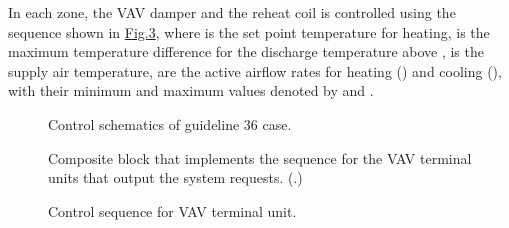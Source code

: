 \documentclass[letterpaper,10pt, openany,english]{sphinxmanual}
\begin{document}
In each zone, the VAV damper and the reheat coil is controlled using the
sequence shown in \hyperref[\detokenize{example:fig-dam-val-reh}]{Fig.\@ \ref{\detokenize{example:fig-dam-val-reh}}}, where
 is the set point temperature for heating,
 is the maximum temperature difference for the discharge temperature above ,
 is the supply air temperature,
 are the active airflow rates for heating () and cooling (),
with their minimum and maximum values denoted by  and .

\begin{figure}[htbp]
\centering
\capstart

\noindent{}
\caption{Control schematics of guideline 36 case.}\label{\detokenize{example:id17}}\label{\detokenize{example:fig-vav-con-sch}}\end{figure}

\begin{figure}[htbp]
\centering
\capstart

\noindent{}
\caption{Composite block that implements the sequence for the VAV terminal units that output the system requests.
(.)}\label{\detokenize{example:id18}}\label{\detokenize{example:fig-sys-req}}\end{figure}

\begin{figure}[htbp]
\centering
\capstart

\noindent{}
\caption{Control sequence for VAV terminal unit.}\label{\detokenize{example:id19}}\label{\detokenize{example:fig-dam-val-reh}}\end{figure}
\end{document}
